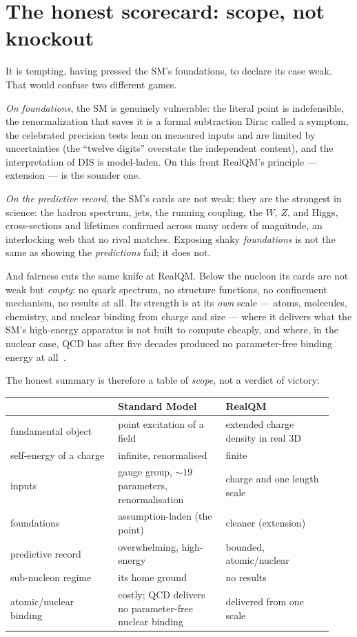 \documentclass[11pt]{article}
\begin{document}
\section{The honest scorecard: scope, not knockout}
\label{sec:score}

It is tempting, having pressed the SM's foundations, to declare its case weak. That would confuse two
different games.

\emph{On foundations}, the SM is genuinely vulnerable: the literal point is indefensible, the
renormalization that saves it is a formal subtraction Dirac called a symptom, the celebrated precision
tests lean on measured inputs and are limited by uncertainties (the ``twelve digits'' overstate the
independent content), and the interpretation of DIS is model-laden. On this front RealQM's principle ---
extension --- is the sounder one.

\emph{On the predictive record}, the SM's cards are not weak; they are the strongest in science: the hadron
spectrum, jets, the running coupling, the $W$, $Z$, and Higgs, cross-sections and lifetimes confirmed across
many orders of magnitude, an interlocking web that no rival matches. Exposing shaky \emph{foundations} is
not the same as showing the \emph{predictions} fail; it does not.

And fairness cuts the same knife at RealQM. Below the nucleon its cards are not weak but \emph{empty}: no
quark spectrum, no structure functions, no confinement mechanism, no results at all. Its strength is at its
\emph{own} scale --- atoms, molecules, chemistry, and nuclear binding from charge and size --- where it
delivers what the SM's high-energy apparatus is not built to compute cheaply, and where, in the nuclear
case, QCD has after five decades produced no parameter-free binding energy at all~\cite{QCDBinding}.

The honest summary is therefore a table of \emph{scope}, not a verdict of victory:

\begin{center}
\begin{tabular}{@{}p{0.31\linewidth} p{0.31\linewidth} p{0.31\linewidth}@{}}
\toprule
 & \textbf{Standard Model} & \textbf{RealQM} \\
\midrule
fundamental object & point excitation of a field & extended charge density in real 3D \\[3pt]
self-energy of a charge & infinite, renormalised & finite \\[3pt]
inputs & gauge group, ${\sim}19$ parameters, renormalisation & charge and one length scale \\[3pt]
foundations & assumption-laden (the point) & cleaner (extension) \\[3pt]
predictive record & overwhelming, high-energy & bounded, atomic/nuclear \\[3pt]
sub-nucleon regime & its home ground & no results \\[3pt]
atomic/nuclear binding & costly; QCD delivers no parameter-free nuclear binding & delivered from one scale \\
\bottomrule
\end{tabular}
\end{center}
\end{document}
